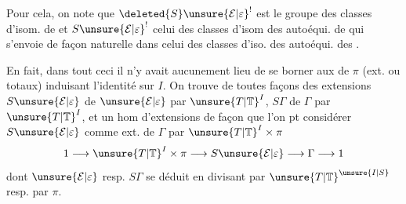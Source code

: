 Pour cela, on note que $\deleted{S}\unsure{\mathcal E|\varepsilon}^{!}$ est le groupe des classes d'isom.  de
et $S\unsure{\mathcal E|\varepsilon}^{!}$ celui des classes d'isom des  autoéqui. de
qui s'envoie de façon naturelle dans celui des classes d'iso. des autoéqui. des 
.

En fait, dans tout ceci il n'y avait aucunement lieu de se borner aux   de $\pi$ (ext. ou totaux) induisant l'identité sur $I$. On trouve de toutes façons des extensions $S\unsure{\mathcal E|\varepsilon}$ de $\unsure{\mathcal E|\varepsilon}$ par $\unsure{T|\mathbb T}^I$, $S\Gamma$ de $\Gamma$ par $\unsure{T|\mathbb T}^I$, et un hom d'extensions
de façon que l'on pt considérer $S\unsure{\mathcal E|\varepsilon}$ comme ext. de $\Gamma$ par $\unsure{T|\mathbb T}^I\times\pi$
\[
1\longrightarrow \unsure{T|\mathbb T}^I\times\pi\longrightarrow S\unsure{\mathcal E|\varepsilon}\longrightarrow\Gamma\longrightarrow1
\]
dont  $\unsure{\mathcal E|\varepsilon}$ resp. $S\Gamma$ se déduit en divisant par $\unsure{T|\mathbb T}^{\unsure{I|S}}$ resp. par $\pi$.

